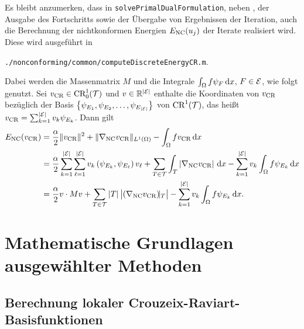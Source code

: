 Es bleibt anzumerken, dass in \texttt{solvePrimalDualFormulation}, neben 
, der Ausgabe des Fortschritts sowie
der Übergabe von Ergebnissen der Iteration, auch die
Berechnung der nichtkonformen Energien $E_\textup{NC}(u_j)$ der Iterate realisiert 
wird. 
Diese wird ausgeführt in
\begin{center}
  \texttt{./nonconforming/common/computeDiscreteEnergyCR.m}.
\end{center}
Dabei werden die Massenmatrix $M$ und die Integrale 
$\int_\Omega f\psi_{F}\,\mathrm{d}x$, $F\in\mathcal{E}$, wie folgt genutzt.
Sei $v_\textup{CR}\in\textup{CR}^1_0(\mathcal{T})$ und $v\in\mathbb{R}^{|\mathcal{E}|}$
enthalte die Koordinaten von $v_\textup{CR}$ bezüglich der Basis
$\left\{\psi_{E_1},\psi_{E_2},\ldots,\psi_{E_{|\mathcal{E}|}}\right\}$
von $\textup{CR}^1(\mathcal{T})$, das heißt
$v_\textup{CR}=\sum_{k=1}^{|\mathcal{E}|}v_k \psi_{E_k}$.
Dann gilt
\begin{align*}
  E_\textup{NC}(v_\textup{CR})
  &=
  \frac{\alpha}{2}\Vert v_\textup{CR}\Vert^2
  + \Vert\nabla_\textup{NC} v_\textup{CR}\Vert_{L^1(\Omega)}
  -\int_\Omega fv_\textup{CR}\,\mathrm{d}x\\
  &=
  \frac{\alpha}{2}
  \sum_{k=1}^{|\mathcal{E}|} 
  \sum_{\ell=1}^{|\mathcal{E}|} 
  v_k\left( \psi_{E_k}, \psi_{E_\ell} \right)v_\ell
  + \sum_{T\in\mathcal{T}}
   \int_T\left|\nabla_\textup{NC} v_\textup{CR}\right|\,\mathrm{d}x
  -\sum_{k=1}^{|\mathcal{E}|}v_k\int_\Omega f\psi_{E_k}\,\mathrm{d}x\\
  &=
  \frac{\alpha}{2} v\cdot Mv
  + \sum_{T\in\mathcal{T}}|T|\, \big|\!\left(\nabla_\textup{NC} v_\textup{CR}\right)\!\!|_T\big|
  -\sum_{k=1}^{|\mathcal{E}|}v_k\int_\Omega f\psi_{E_k}\,\mathrm{d}x.
\end{align*}


\section{Mathematische Grundlagen ausgewählter Methoden}
\label{sec:mathematicalBasicsForMethods}

\subsection{Berechnung lokaler Crouzeix-Raviart-Basisfunktionen}
\label{sec:localCRBasisRealization}

